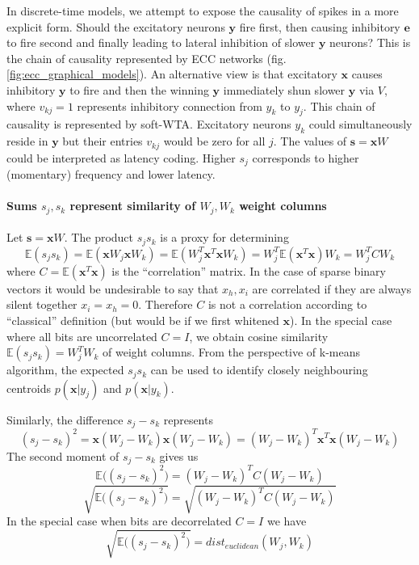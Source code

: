\documentclass[12pt]{article}
\begin{document}
In discrete-time models, we attempt to expose the causality of spikes in a more explicit form. Should the excitatory neurons $\boldsymbol{y}$ fire first, then causing inhibitory $\boldsymbol{e}$ to fire second and finally leading to lateral inhibition of slower $\boldsymbol{y}$ neurons? This is the chain of causality represented by ECC networks (fig. \ref{fig:ecc_graphical_models}). An alternative view is that excitatory $\boldsymbol{x}$ causes inhibitory $\boldsymbol{y}$ to fire and then the winning  $\boldsymbol{y}$ immediately shun slower  $\boldsymbol{y}$ via  $V$, where $v_{kj}=1$ represents inhibitory connection from $y_k$ to $y_j$. This chain of causality is represented by soft-WTA. Excitatory neurons $y_k$ could simultaneously reside in $\boldsymbol{y}$ but their entries $v_{kj}$ would be zero for all $j$.  The values of $\boldsymbol{s}=\boldsymbol{x} W$ could be interpreted as latency coding. Higher $s_j$ corresponds to higher (momentary) frequency and lower latency. 

\paragraph{Sums $s_j,s_k$ represent similarity of $W_j,W_k$ weight columns}
Let $\boldsymbol{s}=\boldsymbol{x} W$. The product $s_j s_k$ is a proxy for determining
\[
\mathbb{E}(s_j s_k) =  \mathbb{E}(\boldsymbol{x} W_j \boldsymbol{x} W_k)=  \mathbb{E}(W_j^T \boldsymbol{x}^T  \boldsymbol{x} W_k) = W_j^T \mathbb{E}(\boldsymbol{x}^T  \boldsymbol{x}) W_k = W_j^T C W_k 
\]
where $C=\mathbb{E}(\boldsymbol{x}^T  \boldsymbol{x})$ is the ``correlation'' matrix. In the case of sparse binary vectors it would be undesirable to say that $x_h,x_i$ are correlated if they are always silent together $x_i=x_h=0$. Therefore  $C$ is not a correlation according to ``classical'' definition (but would be if we first whitened $\boldsymbol{x}$). 
In the special case where all bits are uncorrelated $C=I$, we obtain cosine similarity $\mathbb{E}(s_j s_k)=W_j^TW_k$ of weight columns. From the  perspective of k-means algorithm, the expected $s_j s_k$ can be used to identify closely neighbouring centroids $p(\boldsymbol{x}|y_j)$ and $p(\boldsymbol{x}|y_k)$. 

Similarly, the difference $s_j-s_k$ represents
\[
(s_j - s_k)^2 = \boldsymbol{x} (W_j - W_k) \boldsymbol{x} (W_j - W_k) = (W_j - W_k)^T \boldsymbol{x}^T \boldsymbol{x} (W_j - W_k) 
\]
The second moment of $s_j-s_k$ gives us
\[
\mathbb{E}\big((s_j - s_k)^2\big) = (W_j - W_k)^T C (W_j - W_k)
\]
\[
\sqrt{\mathbb{E}\big((s_j - s_k)^2\big)} = \sqrt{(W_j - W_k)^T C (W_j - W_k) }
\]
In the special case when bits are decorrelated $C=I$ we have
\[
\sqrt{\mathbb{E}\big((s_j - s_k)^2\big)} = dist_{euclidean}(W_j,W_k)
\]
\end{document}
